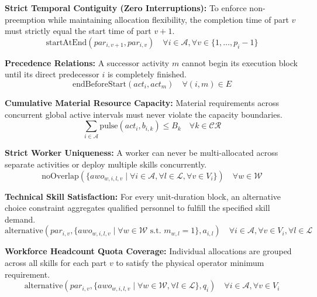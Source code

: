 \documentclass[preprint, authoryear,11pt]{elsarticle}
\begin{document}
\noindent \textbf{Strict Temporal Contiguity (Zero Interruptions):} To enforce non-preemption while maintaining allocation flexibility, the completion time of part $v$ must strictly equal the start time of part $v+1$.
\begin{equation}
    \text{startAtEnd}(par_{i,v+1}, par_{i,v}) \quad \forall i \in \mathcal{A}, \forall v \in \{1, \dots, p_i-1\}
\end{equation}

\noindent \textbf{Precedence Relations:} A successor activity $m$ cannot begin its execution block until its direct predecessor $i$ is completely finished.
\begin{equation}
    \text{endBeforeStart}(act_i, act_m) \quad \forall (i,m) \in E
\end{equation}

\noindent \textbf{Cumulative Material Resource Capacity:} Material requirements across concurrent global active intervals must never violate the capacity boundaries.
\begin{equation}
    \sum_{i \in \mathcal{A}} \text{pulse}(act_i, b_{i,k}) \leq B_k \quad \forall k \in \mathcal{CR}
\end{equation}

\noindent \textbf{Strict Worker Uniqueness:} A worker can never be multi-allocated across separate activities or deploy multiple skills concurrently.
\begin{equation}
    \text{noOverlap}(\{awo_{w,i,l,v} \mid \forall i \in \mathcal{A}, \forall l \in \mathcal{L}, \forall v \in V_i\}) \quad \forall w \in \mathcal{W}
\end{equation}

\noindent \textbf{Technical Skill Satisfaction:} For every unit-duration block, an alternative choice constraint aggregates qualified personnel to fulfill the specified skill demand.
\begin{equation}
    \text{alternative}(par_{i,v}, \{awo_{w,i,l,v} \mid \forall w \in \mathcal{W} \text{ s.t. } m_{w,l}=1\}, a_{i,l}) \quad \forall i \in \mathcal{A}, \forall v \in V_i, \forall l \in \mathcal{L}
\end{equation}

\noindent \textbf{Workforce Headcount Quota Coverage:} Individual allocations are grouped across all skills for each part $v$ to satisfy the physical operator minimum requirement.
\begin{equation}
    \text{alternative}(par_{i,v}, \{awo_{w,i,l,v} \mid \forall w \in \mathcal{W}, \forall l \in \mathcal{L}\}, q_i) \quad \forall i \in \mathcal{A}, \forall v \in V_i
\end{equation}
\end{document}
